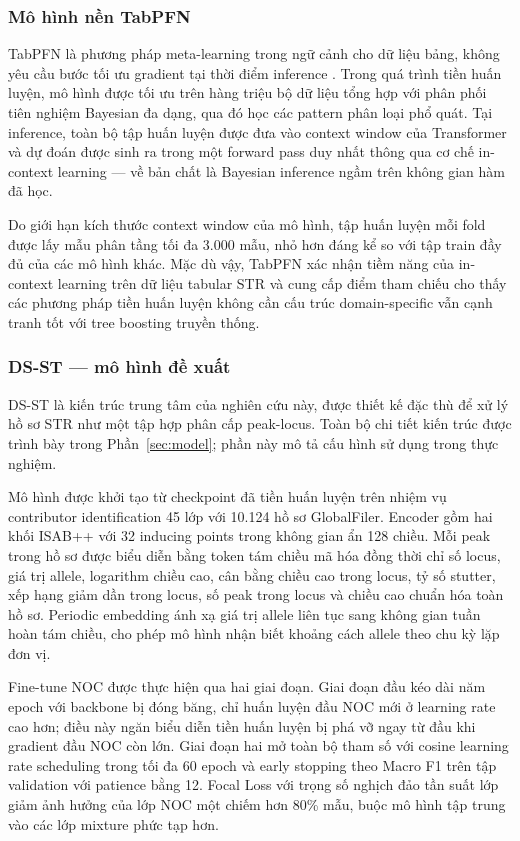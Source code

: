 \documentclass[12pt,a4paper]{article}
\begin{document}
\subsubsection{Mô hình nền TabPFN}

TabPFN là phương pháp meta-learning trong ngữ cảnh cho dữ liệu bảng, không yêu cầu bước tối ưu gradient tại thời điểm inference \cite{hollmann2023}. Trong quá trình tiền huấn luyện, mô hình được tối ưu trên hàng triệu bộ dữ liệu tổng hợp với phân phối tiên nghiệm Bayesian đa dạng, qua đó học các pattern phân loại phổ quát. Tại inference, toàn bộ tập huấn luyện được đưa vào context window của Transformer và dự đoán được sinh ra trong một forward pass duy nhất thông qua cơ chế in-context learning — về bản chất là Bayesian inference ngầm trên không gian hàm đã học.

Do giới hạn kích thước context window của mô hình, tập huấn luyện mỗi fold được lấy mẫu phân tầng tối đa 3.000 mẫu, nhỏ hơn đáng kể so với tập train đầy đủ của các mô hình khác. Mặc dù vậy, TabPFN xác nhận tiềm năng của in-context learning trên dữ liệu tabular STR và cung cấp điểm tham chiếu cho thấy các phương pháp tiền huấn luyện không cần cấu trúc domain-specific vẫn cạnh tranh tốt với tree boosting truyền thống.

\subsubsection{DS-ST — mô hình đề xuất}

DS-ST là kiến trúc trung tâm của nghiên cứu này, được thiết kế đặc thù để xử lý hồ sơ STR như một tập hợp phân cấp peak-locus. Toàn bộ chi tiết kiến trúc được trình bày trong Phần~\ref{sec:model}; phần này mô tả cấu hình sử dụng trong thực nghiệm.

Mô hình được khởi tạo từ checkpoint đã tiền huấn luyện trên nhiệm vụ contributor identification 45 lớp với 10.124 hồ sơ GlobalFiler. Encoder gồm hai khối ISAB++ với 32 inducing points trong không gian ẩn 128 chiều. Mỗi peak trong hồ sơ được biểu diễn bằng token tám chiều mã hóa đồng thời chỉ số locus, giá trị allele, logarithm chiều cao, cân bằng chiều cao trong locus, tỷ số stutter, xếp hạng giảm dần trong locus, số peak trong locus và chiều cao chuẩn hóa toàn hồ sơ. Periodic embedding ánh xạ giá trị allele liên tục sang không gian tuần hoàn tám chiều, cho phép mô hình nhận biết khoảng cách allele theo chu kỳ lặp đơn vị.

Fine-tune NOC được thực hiện qua hai giai đoạn. Giai đoạn đầu kéo dài năm epoch với backbone bị đóng băng, chỉ huấn luyện đầu NOC mới ở learning rate cao hơn; điều này ngăn biểu diễn tiền huấn luyện bị phá vỡ ngay từ đầu khi gradient đầu NOC còn lớn. Giai đoạn hai mở toàn bộ tham số với cosine learning rate scheduling trong tối đa 60 epoch và early stopping theo Macro F1 trên tập validation với patience bằng 12. Focal Loss với trọng số nghịch đảo tần suất lớp giảm ảnh hưởng của lớp NOC một chiếm hơn 80\% mẫu, buộc mô hình tập trung vào các lớp mixture phức tạp hơn.
\end{document}
